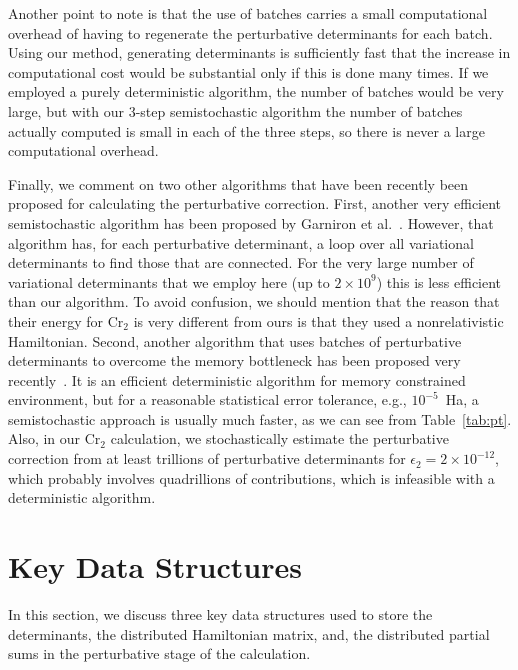 \documentclass[%
reprint,
 superscriptaddress,
 amsmath,amssymb,
 aps,
]{revtex4-1}
\begin{document}
Another point to note is that the use of batches carries a small computational overhead of having to regenerate the
perturbative determinants for each batch.  Using our method, generating determinants is sufficiently fast that the
increase in computational cost would be substantial only if this is done many times.  If we employed a purely
deterministic algorithm, the number of batches would be very large, but with our 3-step semistochastic algorithm
the number of batches actually computed is small in each of the three steps, so there is never a large computational overhead.

Finally, we comment on two other algorithms that have been recently been proposed for calculating the perturbative correction.
First, another very efficient semistochastic algorithm has been proposed
by Garniron et al.~\cite{GarSceLooCaf-JCP-17}.  However, that algorithm has, for each perturbative determinant, a loop over all variational determinants to find those that are connected.  For the very large number of variational determinants that we employ
here (up to $2 \times 10^9$) this is less efficient than our algorithm.
To avoid confusion, we should mention that the reason that their energy for Cr$_2$ is very different from ours is
that they used a nonrelativistic Hamiltonian.
Second, another algorithm that uses batches of perturbative determinants to overcome the memory bottleneck has been proposed
very recently~\cite{TubLevHaiHeaWha-ARX-18}.
It is an efficient deterministic algorithm for memory constrained environment, but for a reasonable statistical error tolerance, e.g., $10^{-5}$~Ha, a semistochastic approach is usually much faster, as we can see from Table~\ref{tab:pt}.
Also, in our Cr$_2$ calculation, we stochastically estimate the perturbative correction from at least trillions of perturbative determinants
for $\epsilon_2=2\times10^{-12}$, which probably involves quadrillions of contributions, which is infeasible with a deterministic algorithm.


\section{Key Data Structures}
\label{key}
In this section, we discuss three key data structures used to store the determinants, the distributed Hamiltonian matrix, and,
the distributed partial sums in the perturbative stage of the calculation.
\end{document}
